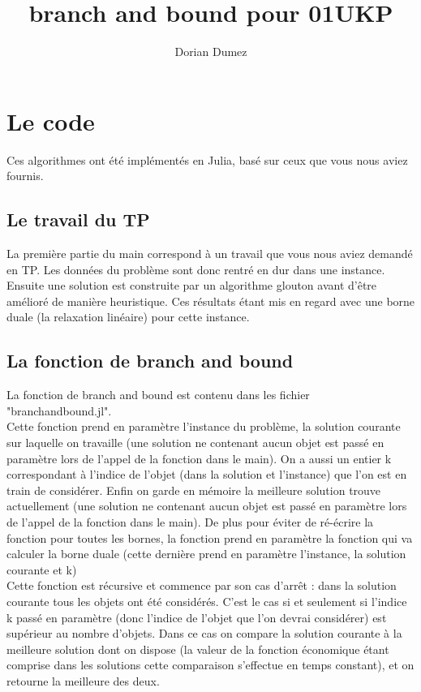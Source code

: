 \documentclass[12pt,a4paper]{article}
\title{branch and bound pour 01UKP}
\author{Dorian Dumez}
\begin{document}
\maketitle

\section{Le code}
Ces algorithmes ont été implémentés en Julia, basé sur ceux que vous nous aviez fournis.

\subsection{Le travail du TP}
La première partie du main correspond à un travail que vous nous aviez demandé en TP. Les données du problème sont donc rentré en dur dans une instance. Ensuite une solution est construite par un algorithme glouton avant d’être amélioré de manière heuristique. Ces résultats étant mis en regard avec une borne duale (la relaxation linéaire) pour cette instance.\\

\subsection{La fonction de branch and bound}
La fonction de branch and bound est contenu dans les fichier "branchandbound.jl".\\

Cette fonction prend en paramètre l'instance du problème, la solution courante sur laquelle on travaille (une solution ne contenant aucun objet est passé en paramètre lors de l'appel de la fonction dans le main). On a aussi un entier k correspondant à l'indice de l'objet (dans la solution et l'instance) que l'on est en train de considérer. Enfin on garde en mémoire la meilleure solution trouve actuellement (une solution ne contenant aucun objet est passé en paramètre lors de l'appel de la fonction dans le main). De plus pour éviter de ré-écrire la fonction pour toutes les bornes, la fonction prend en paramètre la fonction qui va calculer la borne duale (cette dernière prend en paramètre l'instance, la solution courante et k)\\

Cette fonction est récursive et commence par son cas d’arrêt : dans la solution courante tous les objets ont été considérés. C'est le cas si et seulement si l'indice k passé en paramètre (donc l'indice de l'objet que l'on devrai considérer) est supérieur au nombre d'objets. Dans ce cas on compare la solution courante à la meilleure solution dont on dispose (la valeur de la fonction économique étant comprise dans les solutions cette comparaison s’effectue en temps constant), et on retourne la meilleure des deux.\\
\end{document}
